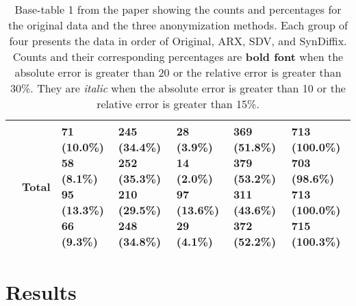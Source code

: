 \documentclass[10pt]{article}
\begin{document}
\begin{table}
\begin{center}
\begin{small}
\begin{tabular}{lllllll}
& Total      & \makecell[l]{71 (10.0\%) \\58 (8.1\%) \\95 (13.3\%) \\66 (9.3\%) \\}      & \makecell[l]{245 (34.4\%) \\252 (35.3\%) \\210 (29.5\%) \\248 (34.8\%) \\}      & \makecell[l]{28 (3.9\%) \\14 (2.0\%) \\97 (13.6\%) \\29 (4.1\%) \\}      & \makecell[l]{369 (51.8\%) \\379 (53.2\%) \\311 (43.6\%) \\372 (52.2\%) \\}      & \makecell[l]{713 (100.0\%)  \\703 (98.6\%)  \\713 (100.0\%)  \\715 (100.3\%)  \\} \\ 

      \bottomrule
      \end{tabular}
      \end{small}
      \caption{Base-table 1 from the paper showing the counts and percentages for the original data and the three anonymization methods. Each group of four presents the data in order of Original, ARX, SDV, and SynDiffix. Counts and their corresponding percentages are \textbf{bold font} when the absolute error is greater than 20 or the relative error is greater than 30\%. They are \textit{italic} when the absolute error is greater than 10 or the relative error is greater than 15\%.}
      \label{tab:table1}
      \end{center}
      \end{table}
      \setlength{\fboxsep}{3pt}
    

\section*{Results}
\end{document}
